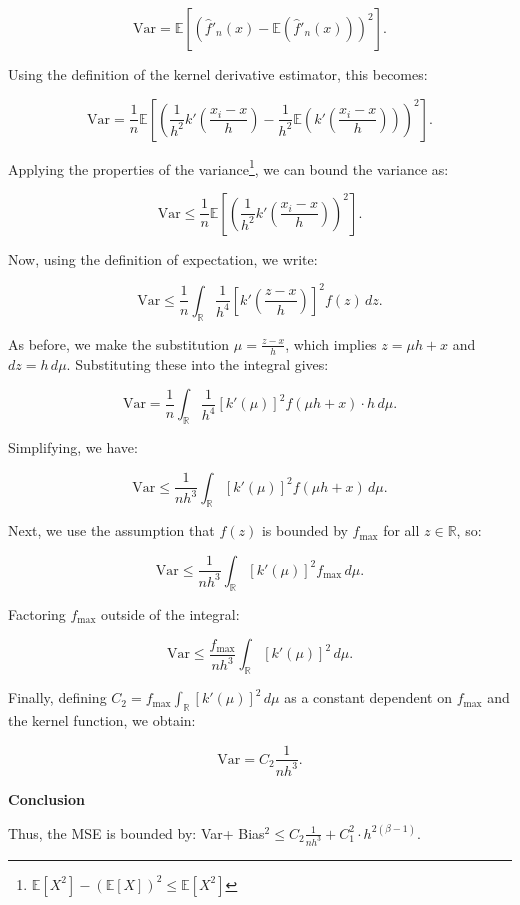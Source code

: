 \documentclass{article}
\begin{document}
\[
\text{Var} = \mathbb{E}\left[\left(\hat{f}'_n(x) - \mathbb{E}(\hat{f}'_n(x))\right)^2\right].
\]

Using the definition of the kernel derivative estimator, this becomes:

\[
\text{Var} = \frac{1}{n} \mathbb{E}\left[\left(\frac{1}{h^2} k'\left(\frac{x_i - x}{h}\right) - \frac{1}{h^2} \mathbb{E}\left(k'\left(\frac{x_i - x}{h}\right)\right)\right)^2\right].
\]

Applying the properties of the variance\footnote{\(\mathbb{E}[X^2] - (\mathbb{E}[X])^2 \leq \mathbb{E}[X^2]\)}, we can bound the variance as:

\[
\text{Var} \leq \frac{1}{n} \mathbb{E}\left[\left(\frac{1}{h^2} k'\left(\frac{x_i - x}{h}\right)\right)^2\right].
\]

Now, using the definition of expectation, we write:

\[
\text{Var} \leq \frac{1}{n} \int_{\mathbb{R}} \frac{1}{h^4} \left[k'\left(\frac{z - x}{h}\right)\right]^2 f(z) \, dz.
\]

As before, we make the substitution \(\mu = \frac{z - x}{h}\), which implies \(z = \mu h + x\) and \(dz = h \, d\mu\). Substituting these into the integral gives:

\[
\text{Var} = \frac{1}{n} \int_{\mathbb{R}} \frac{1}{h^4} \left[k'(\mu)\right]^2 f(\mu h + x) \cdot h \, d\mu.
\]

Simplifying, we have:

\[
\text{Var} \leq \frac{1}{n h^3} \int_{\mathbb{R}} \left[k'(\mu)\right]^2 f(\mu h + x) \, d\mu.
\]

Next, we use the assumption that \(f(z)\) is bounded by \(f_{\text{max}}\) for all \(z \in \mathbb{R}\), so:

\[
\text{Var} \leq \frac{1}{n h^3} \int_{\mathbb{R}} \left[k'(\mu)\right]^2 f_{\text{max}} \, d\mu.
\]

Factoring \(f_{\text{max}}\) outside of the integral:

\[
\text{Var} \leq \frac{f_{\text{max}}}{n h^3} \int_{\mathbb{R}} \left[k'(\mu)\right]^2 \, d\mu.
\]

Finally, defining \(C_2 = f_{\text{max}} \int_{\mathbb{R}} \left[k'(\mu)\right]^2 \, d\mu\) as a constant dependent on \(f_{\text{max}}\) and the kernel function, we obtain:

\[
\text{Var} = C_2 \frac{1}{n h^3}.
\]


\textbf{Conclusion}

Thus, the MSE is bounded by: Var+ Bias\(^{2}\leq C_{2}\frac{1}{nh^{3}} +C_1^{2} \cdot h^{2(\beta - 1)}\). \\ 
\end{document}
